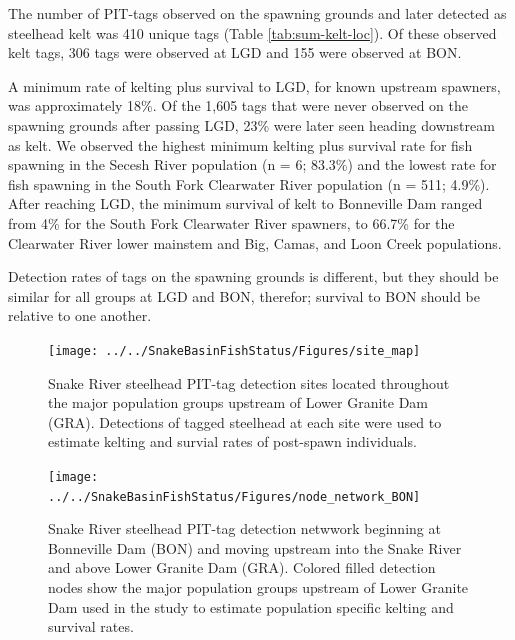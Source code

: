 \documentclass[11pt,a4paper,]{article}
\begin{document}
The number of PIT-tags observed on the spawning grounds and later detected as steelhead kelt was 410 unique tags (Table \ref{tab:sum-kelt-loc}). Of these observed kelt tags, 306 tags were observed at LGD and 155 were observed at BON.

A minimum rate of kelting plus survival to LGD, for known upstream spawners, was approximately 18\%. Of the 1,605 tags that were never observed on the spawning grounds after passing LGD, 23\% were later seen heading downstream as kelt. We observed the highest minimum kelting plus survival rate for fish spawning in the Secesh River population (n = 6; 83.3\%) and the lowest rate for fish spawning in the South Fork Clearwater River population (n = 511; 4.9\%). After reaching LGD, the minimum survival of kelt to Bonneville Dam ranged from 4\% for the South Fork Clearwater River spawners, to 66.7\% for the Clearwater River lower mainstem and Big, Camas, and Loon Creek populations.

Detection rates of tags on the spawning grounds is different, but they should be similar for all groups at LGD and BON, therefor; survival to BON should be relative to one another.

\begin{figure}
\texttt{[image: ../../SnakeBasinFishStatus/Figures/site\_map]} \caption{Snake River steelhead PIT-tag detection sites located throughout the major population groups upstream of Lower Granite Dam (GRA). Detections of tagged steelhead at each site were used to estimate kelting and survial rates of post-spawn individuals.}\label{fig:map}
\end{figure}

\begin{figure}
\texttt{[image: ../../SnakeBasinFishStatus/Figures/node\_network\_BON]} \caption{Snake River steelhead PIT-tag detection netwwork beginning at Bonneville Dam (BON) and moving upstream into the Snake River and above Lower Granite Dam (GRA). Colored filled detection nodes show the major population groups upstream of Lower Granite Dam used in the study to estimate population specific kelting and survival rates.}\label{fig:node-network}
\end{figure}

\providecommand{\docline}[3]{\noalign{\global\setlength{\arrayrulewidth}{#1}}\arrayrulecolor[HTML]{#2}\cline{#3}}

\setlength{\tabcolsep}{2pt}

\renewcommand*{\arraystretch}{1.5}
\end{document}
